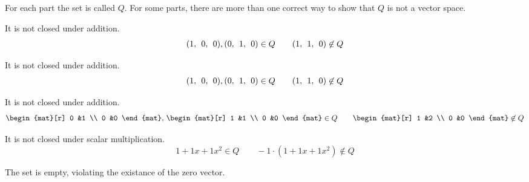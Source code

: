 \begin{Answer}

For each part the set is called \( Q \).
For some parts, there are more than one correct way to show that $Q$ is not
a vector space.

\Question It is not closed under addition.
\begin{equation*}
\rowvec{1, &0, &0},
\rowvec{0, &1, &0}\in Q
\qquad
\rowvec{1, &1, &0}\not\in Q
\end{equation*}

\Question It is not closed under addition.
\begin{equation*}
\rowvec{1, &0, &0},
\rowvec{0, &1, &0}\in Q
\qquad
\rowvec{1, &1, &0}\not\in Q
\end{equation*}
  
\Question It is not closed under addition.
\begin{equation*}
\begin{mat}[r]
0  &1  \\
0  &0
\end{mat},
\,
\begin{mat}[r]
1  &1  \\
0  &0
\end{mat}\in Q
\qquad
\begin{mat}[r]
1  &2  \\
0  &0
\end{mat}\not\in Q
\end{equation*}

\Question It is not closed under scalar multiplication.
\begin{equation*}
1+1x+1x^2\in Q
\qquad
-1\cdot(1+1x+1x^2)\not\in Q
\end{equation*}

\Question The set is empty, violating the existance of the zero vector.

\end{Answer}
